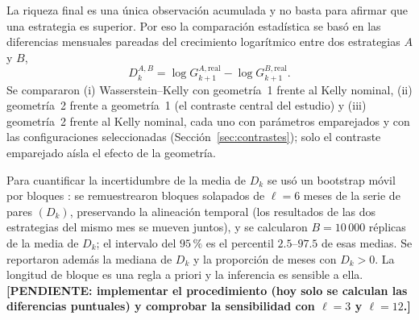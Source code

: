 La riqueza final es una única observación acumulada y no basta para afirmar que una estrategia es superior. Por eso la comparación estadística se basó en las diferencias mensuales pareadas del crecimiento logarítmico entre dos estrategias $A$ y $B$,
\begin{equation}\label{eq:D}
D^{A,B}_k=\log G^{A,\mathrm{real}}_{k+1}-\log G^{B,\mathrm{real}}_{k+1}.
\end{equation}
Se compararon (i) Wasserstein--Kelly con geometría~1 frente al Kelly nominal, (ii) geometría~2 frente a geometría~1 (el contraste central del estudio) y (iii) 
geometría~2 frente al Kelly nominal, cada uno con parámetros emparejados y con las configuraciones seleccionadas (Sección~\ref{sec:contrastes}); solo el contraste emparejado aísla el efecto de la geometría.

Para cuantificar la incertidumbre de la media de $D_k$ se usó un bootstrap móvil por bloques \citep{kunsch1989}: se remuestrearon bloques solapados de $\ell=6$ meses de la serie de pares $(D_k)$, preservando la alineación temporal (los resultados de las dos estrategias del mismo mes se mueven juntos), y se calcularon $B=10\,000$ réplicas de la media de $D_k$; el intervalo del $95\,\%$ es el percentil $2.5$--$97.5$ de esas medias. Se reportaron además la mediana de $D_k$ y la proporción de meses con $D_k>0$. La longitud de bloque es una regla a priori y la inferencia es sensible a ella. \textbf{[PENDIENTE: implementar el procedimiento (hoy solo se calculan las diferencias puntuales) y comprobar la sensibilidad con $\ell=3$ y $\ell=12$.]}

